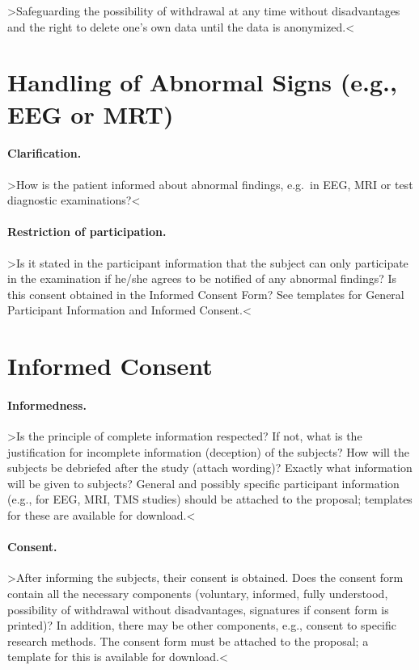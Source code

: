 \documentclass[11pt,twoside,a4paper]{article}
\begin{document}
>Safeguarding the possibility of withdrawal at any time without disadvantages and the right to delete one's own data until the data is anonymized.<

\section{Handling of Abnormal Signs (e.g., EEG or MRT)}

\paragraph{Clarification.}

>How is the patient informed about abnormal findings, e.g.~in EEG, MRI or test diagnostic examinations?<

\paragraph{Restriction of participation.}

>Is it stated in the participant information that the subject can only participate in the examination if he/she agrees to be notified of any abnormal findings?
Is this consent obtained in the Informed Consent Form?
See templates for General Participant Information and Informed Consent.<

\section{Informed Consent}

\paragraph{Informedness.}

>Is the principle of complete information respected?
If not, what is the justification for incomplete information (deception) of the subjects?
How will the subjects be debriefed after the study (attach wording)?
Exactly what information will be given to subjects?
General and possibly specific participant information (e.g., for EEG, MRI, TMS studies) should be attached to the proposal; templates for these are available for download.<

\paragraph{Consent.}

>After informing the subjects, their consent is obtained.
Does the consent form contain all the necessary components (voluntary, informed, fully understood, possibility of withdrawal without disadvantages, signatures if consent form is printed)?
In addition, there may be other components, e.g., consent to specific research methods.
The consent form must be attached to the proposal; a template for this is available for download.<
\end{document}
